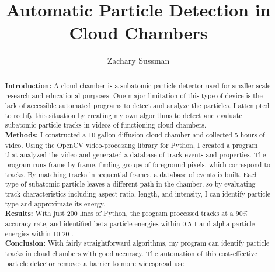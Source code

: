 \documentclass[notitlepage]{article}
\author{Zachary Sussman}
\title{Automatic Particle Detection in Cloud Chambers}
\date{}
\begin{document}
 




\maketitle

\begin{abstract}
\noindent
\textbf{Introduction:} A cloud chamber is a subatomic particle detector used for smaller-scale research and educational purposes.  One major limitation of this type of device is the lack of accessible automated programs to detect and analyze the particles. I attempted to rectify this situation by creating my own algorithms to detect and evaluate subatomic particle tracks in videos of functioning cloud chambers.
\\ \textbf{Methods:} I constructed a 10 gallon diffusion cloud chamber and collected 5 hours of video.  Using the OpenCV video-processing library for Python, I created a program that analyzed the video and generated a database of track events and properties. The program runs frame by frame, finding groups of foreground pixels, which correspond to tracks.  By matching tracks in sequential frames, a database of events is built. Each type of subatomic particle leaves a different path in the chamber, so by evaluating track characteristics including aspect ratio, length, and intensity, I can identify particle type and approximate its energy.
\\ \textbf{Results:} With just 200 lines of Python, the program processed tracks at a 90\% accuracy rate, and identified beta particle energies within 0.5-1 \kilo{}\electronvolt and alpha particle energies within 10-20 \kilo{}\electronvolt. 
\\ \textbf{Conclusion:} With fairly straightforward algorithms, my program can identify particle tracks in cloud chambers with good accuracy. The automation of this cost-effective particle detector removes a barrier to more widespread use.


\end{abstract}
\end{document}

